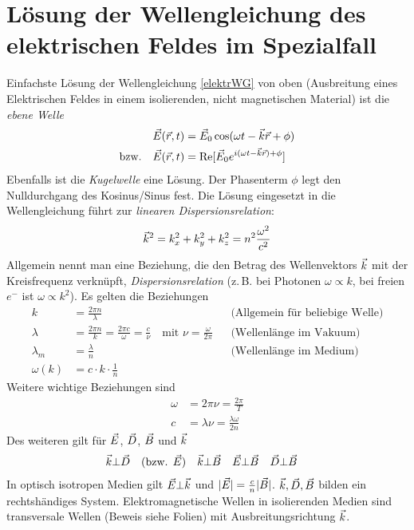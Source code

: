 \section[Lösung der Wellengleichung]{Lösung der Wellengleichung des elektrischen Feldes im Spezialfall}
Einfachste Lösung der Wellengleichung \eqref{elektrWG} von oben
(Ausbreitung eines Elektrischen Feldes in einem isolierenden, nicht
magnetischen Material) ist die 
\emph{ebene Welle}%
%
\begin{align*}
	\vec{E}(\vec{r},t)&= \vec{E}_0 \cos(\omega t- \vec{k}\vec{r}+\phi)\\
	\text{bzw.}\quad\vec{E}(\vec{r},t)&= \operatorname{Re}[\vec{E}_0e^{i(\omega t-\vec{k}\vec{r})+\phi}]
\end{align*}
Ebenfalls ist die \emph{Kugelwelle}%
eine Lösung. Der Phasenterm $\phi$ legt den Nulldurchgang des
Kosinus/Sinus fest. Die Lösung eingesetzt in die Wellengleichung führt
zur \emph{linearen Dispersionsrelation}:
\begin{align*}
	\vec{k}^2=k_x^2+k_y^2+k_z^2=n^2\frac{\omega^2}{c^2}
\end{align*}
Allgemein nennt man eine Beziehung, die den Betrag des Wellenvektors $\vec{k}$%
%
mit der Kreisfrequenz
verknüpft, \emph{Dispersionsrelation} 
(z.\,B. bei Photonen $\omega\propto k$, bei freien $e^-$ ist
$\omega\propto k^2$).
Es gelten die Beziehungen
\begin{align*}
  k &= \frac{2\pi n}{\lambda}
  &&\text{(Allgemein für beliebige Welle)}\\
  \lambda &= \frac{2\pi n}{k} = \frac{2\pi c}{\omega}=\frac{c}{\nu}
            \quad \text{mit } \nu=\frac{\omega}{2\pi}
  &&\text{(Wellenlänge im Vakuum)}\\
  \lambda_m &= \frac{\lambda}{n} 
  &&\text{(Wellenlänge im Medium)}\\
  \omega(k) &= c\cdot k\cdot \frac{1}{n}
\end{align*}%
%
%
Weitere wichtige Beziehungen sind
\begin{align*}
	\omega&=2\pi \nu =\frac{2\pi}{T}\\
	c&=\lambda\nu=\frac{\lambda\omega}{2n}
\end{align*}%
%
Des weiteren gilt für $\vec{E}$, $\vec{D}$, $\vec{B}$ und $\vec{k}$
\begin{align*}
	\vec{k}&\bot\vec{D} \quad(\text{bzw. }\vec{E})&
	\vec{k}&\bot \vec{B}&
	\vec{E}&\bot \vec{B}&
	\vec{D}&\bot\vec{B}
\end{align*}
In optisch isotropen Medien gilt $\vec{E}\bot\vec{k}$ und
$\vert\vec{E}\vert= \frac{c}{n} \vert\vec{B}\vert$.
$\vec{k},\vec{D},\vec{B}$ bilden ein rechtshändiges System.
Elektromagnetische Wellen in isolierenden Medien sind transversale
Wellen (Beweis siehe Folien) mit Ausbreitungsrichtung $\vec{k}$.

